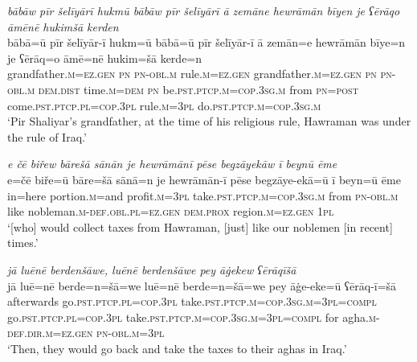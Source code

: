 \ea \label{BP.21}
\textit{bābāw pīr šelīyārī hukmū bābāw pīr šelīyārī ā zemāne hewrāmān bīyen je ʕērāqo āmēnē hukimšā kerden} \\ 
\gll bābā=ū pīr šelīyār-ī hukm=ū bābā=ū pīr šelīyār-ī ā zemān=e hewrāmān bīye=n je ʕērāq=o āmē=nē hukim=šā kerde=n \\ 
 grandfather\textsc{.m}\textsc{=ez.gen} \textsc{pn} \textsc{pn}\textsc{-obl}\textsc{.m} rule\textsc{.m}\textsc{=ez.gen} grandfather\textsc{.m}\textsc{=ez.gen} \textsc{pn} \textsc{pn}\textsc{-obl}\textsc{.m} \textsc{dem.dist} time\textsc{.m}\textsc{=dem} \textsc{pn} be\textsc{.pst}\textsc{.ptcp}\textsc{.m}\textsc{=cop}\textsc{.3sg}\textsc{.m} from \textsc{pn}\textsc{=\textsc{post}} come\textsc{.pst}\textsc{.ptcp}\textsc{.pl}\textsc{=cop}\textsc{.3pl} rule\textsc{.m}\textsc{=3pl} do\textsc{.pst}\textsc{.ptcp}\textsc{.m}\textsc{=cop}\textsc{.3sg}\textsc{.m} \\ 
\glt `Pir Shaliyar’s grandfather, at the time of his religious rule, Hawraman was under the rule of Iraq.'
\z 
 
\ea \label{BP.24}
\textit{e čē biřew bārešā sānān je hewrāmānī pēse begzāyekāw ī beynū ēme} \\ 
\gll e=čē biře=ū bāre=šā sānā=n je hewrāmān-ī pēse begzāye-ekā=ū ī beyn=ū ēme \\ 
 in=here portion\textsc{.m}=and profit\textsc{.m}\textsc{=3pl} take\textsc{.pst}\textsc{.ptcp}\textsc{.m}\textsc{=cop}\textsc{.3sg}\textsc{.m} from \textsc{pn}\textsc{-obl}\textsc{.m} like nobleman\textsc{.m}\textsc{-def}\textsc{.obl}\textsc{.pl}\textsc{=ez.gen} \textsc{dem.prox} region\textsc{.m}\textsc{=ez.gen} \textsc{1pl} \\ 
\glt `[who] would collect taxes from Hawraman, [just] like our noblemen [in recent] times.'
\z 
 
\ea \label{BP.27}
\textit{jā luēnē berdenšāwe, luēnē berdenšāwe pey āġekew ʕērāqīšā} \\ 
\gll jā luē=nē berde=n=šā=we luē=nē berde=n=šā=we pey āġe-eke=ū ʕērāq-ī=šā \\ 
 afterwards go\textsc{.pst}\textsc{.ptcp}\textsc{.pl}\textsc{=cop}\textsc{.3pl} take\textsc{.pst}\textsc{.ptcp}\textsc{.m}\textsc{=cop}\textsc{.3sg}\textsc{.m}\textsc{=3pl}\textsc{=compl} go\textsc{.pst}\textsc{.ptcp}\textsc{.pl}\textsc{=cop}\textsc{.3pl} take\textsc{.pst}\textsc{.ptcp}\textsc{.m}\textsc{=cop}\textsc{.3sg}\textsc{.m}\textsc{=3pl}\textsc{=compl} for agha\textsc{.m}\textsc{-def}\textsc{.dir}\textsc{.m}\textsc{=ez.gen} \textsc{pn}\textsc{-obl}\textsc{.m}\textsc{=3pl} \\ 
\glt `Then, they would go back and take the taxes to their aghas in Iraq.'
\z 
 
